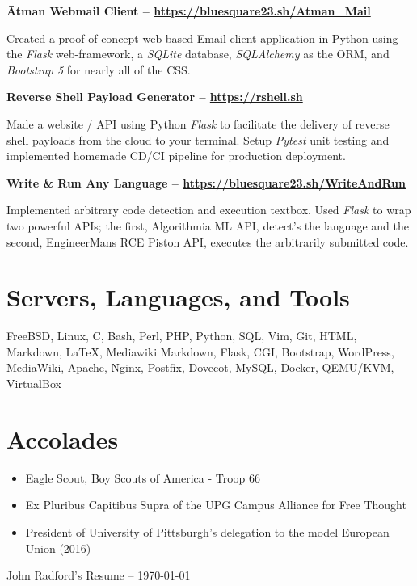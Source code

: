 \documentclass{article}
\begin{document}
\noindent
\textbf{Ātman Webmail Client -- \url{https://bluesquare23.sh/Atman_Mail}}

Created a proof-of-concept web based Email client application in Python using
the \emph{Flask} web-framework, a \emph{SQLite} database, \emph{SQLAlchemy} as
the ORM, and \emph{Bootstrap 5} for nearly all of the CSS.

\noindent
\textbf{Reverse Shell Payload Generator -- \url{https://rshell.sh}}

Made a website / API using Python \emph{Flask} to facilitate the delivery of
reverse shell payloads from the cloud to your terminal. Setup \emph{Pytest}
unit testing and implemented homemade CD/CI pipeline for production deployment.

\noindent
\textbf{Write \& Run Any Language -- \url{https://bluesquare23.sh/WriteAndRun}}

Implemented arbitrary code detection and execution textbox. Used \emph{Flask}
to wrap two powerful APIs; the first, Algorithmia ML API, detect's the language
and the second, EngineerMans RCE Piston API, executes the arbitrarily submitted
code.

\section{Servers, Languages, and Tools}

FreeBSD, Linux, C, Bash, Perl, PHP, Python, SQL, Vim, Git, HTML, Markdown,
{\LaTeX}, Mediawiki Markdown, Flask, CGI, Bootstrap, WordPress, MediaWiki,
Apache, Nginx, Postfix, Dovecot, MySQL, Docker, QEMU/KVM, VirtualBox 

\section{Accolades}

\begin{itemize}
\itemsep0em

\item Eagle Scout, Boy Scouts of America - Troop 66

\item Ex Pluribus Capitibus Supra of the UPG Campus Alliance for Free Thought

\item President of University of Pittsburgh's delegation to the model European Union (2016)
\end{itemize}

\begin{center}
John Radford's Resume -- \small\today\\
\end{center}
\end{document}

